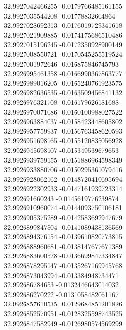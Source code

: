 {32.9927042466255	-0.0179766485161155\\
32.9927035544208	-0.01778832604864\\
32.9927028692313	-0.0176019729341618\\
32.9927021909885	-0.0174175686510486\\
32.9927015196245	-0.0172350928900149\\
32.9927008550721	-0.0170545255519524\\
32.9927001972646	-0.016875846745793\\
32.9926995461358	-0.0166990367863777\\
32.9926989016205	-0.0165240761923575\\
32.9926982636535	-0.0163509456841132\\
32.9926976321708	-0.016179626181688\\
32.9926970071086	-0.0160100988027522\\
32.9926963884037	-0.0158423448605802\\
32.9926957759937	-0.0156763458620593\\
32.9926951698165	-0.0155120835056928\\
32.9926945698107	-0.015349539679653\\
32.9926939759155	-0.0151886964598349\\
32.9926933880706	-0.0150295361079416\\
32.9926928062162	-0.0148720410695694\\
32.9926922302933	-0.0147161939723314\\
32.992691660243	-0.0145619776239874\\
32.9926910960074	-0.0144093750106181\\
32.9926905375289	-0.0142583692947679\\
32.9926899847504	-0.0141089438136569\\
32.9926894376154	-0.0139610820773815\\
32.9926888960681	-0.0138147677671389\\
32.9926883600528	-0.0136699847334847\\
32.9926878295147	-0.0135267169945768\\
32.9926873043994	-0.013384948734471\\
32.992686784653	-0.0132446643014032\\
32.992686270222	-0.0131058482061167\\
32.9926857610535	-0.0129684851201826\\
32.9926852570951	-0.0128325598743525\\
32.9926847582949	-0.0126980574569299\\
}
